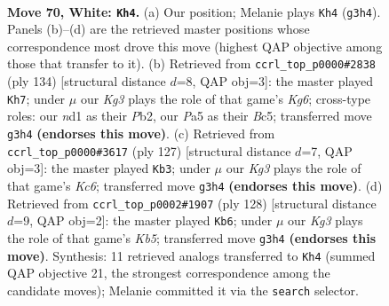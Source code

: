 \documentclass[11pt]{article}
\begin{document}
\clearpage

\begin{figure}[p]\centering
\begin{subfigure}{0.46\textwidth}\centering
\resizebox{\linewidth}{!}{%
\newchessgame
\chessboard[
  setfen={2k5/8/4b3/P7/1P6/6K1/8/3n4 w - - 6 70},
  showmover=false,
  pgfstyle=straightmove, color=movearrow, markmove={g3-h4}
]}
\caption{}
\end{subfigure}\hfill
\begin{subfigure}{0.46\textwidth}\centering
\resizebox{\linewidth}{!}{%
\newchessgame
\chessboard[
  setfen={8/8/4k1K1/1pB5/6b1/8/1P6/8 w - - 0 68},
  showmover=false,
  pgfstyle=straightmove, color=movearrow, markmove={g6-h7}
]}
\caption{}
\end{subfigure}
\\[4pt]
\begin{subfigure}{0.46\textwidth}\centering
\resizebox{\linewidth}{!}{%
\newchessgame
\chessboard[
  setfen={4K3/8/6B1/p7/P7/2k5/8/4n3 b - - 12 64},
  showmover=false,
  pgfstyle=straightmove, color=movearrow, markmove={c3-b3}
]}
\caption{}
\end{subfigure}\hfill
\begin{subfigure}{0.46\textwidth}\centering
\resizebox{\linewidth}{!}{%
\newchessgame
\chessboard[
  setfen={8/3N1P2/7b/1K5p/5k2/7P/8/8 w - - 3 65},
  showmover=false,
  pgfstyle=straightmove, color=movearrow, markmove={b5-b6}
]}
\caption{}
\end{subfigure}
\caption{\textbf{Move 70, White: \texttt{Kh4}.} (a) Our position; Melanie plays \texttt{Kh4} (\texttt{g3h4}). Panels (b)--(d) are the retrieved master positions whose correspondence most drove this move (highest QAP objective among those that transfer to it). (b) Retrieved from \texttt{ccrl\_top\_p0000\#2838} (ply 134) [structural distance $d$=8, QAP obj=3]: the master played \texttt{Kh7}; under $\mu$ our \emph{Kg3} plays the role of that game's \emph{Kg6}; cross-type roles: our \emph{n}d1 as their \emph{P}b2, our \emph{P}a5 as their \emph{B}c5; transferred move \texttt{g3h4} \textbf{(endorses this move)}. (c) Retrieved from \texttt{ccrl\_top\_p0000\#3617} (ply 127) [structural distance $d$=7, QAP obj=3]: the master played \texttt{Kb3}; under $\mu$ our \emph{Kg3} plays the role of that game's \emph{Kc6}; transferred move \texttt{g3h4} \textbf{(endorses this move)}. (d) Retrieved from \texttt{ccrl\_top\_p0002\#1907} (ply 128) [structural distance $d$=9, QAP obj=2]: the master played \texttt{Kb6}; under $\mu$ our \emph{Kg3} plays the role of that game's \emph{Kb5}; transferred move \texttt{g3h4} \textbf{(endorses this move)}. Synthesis: 11 retrieved analogs transferred to \texttt{Kh4} (summed QAP objective 21, the strongest correspondence among the candidate moves); Melanie committed it via the \texttt{search} selector.}
\label{fig:thought-m138}
\end{figure}
\end{document}
